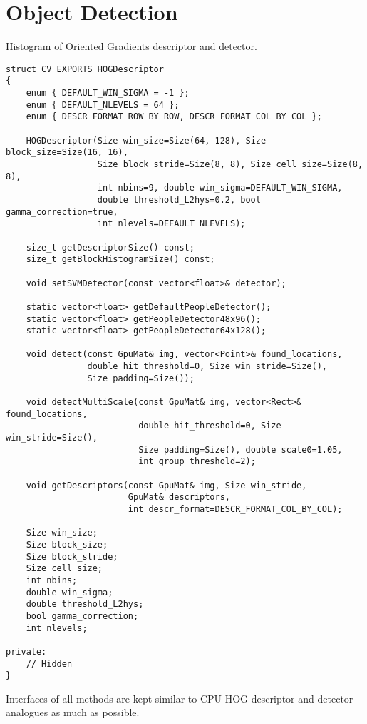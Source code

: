 \section{Object Detection}

Histogram of Oriented Gradients descriptor and detector.

\begin{lstlisting}
struct CV_EXPORTS HOGDescriptor
{
    enum { DEFAULT_WIN_SIGMA = -1 };
    enum { DEFAULT_NLEVELS = 64 };
    enum { DESCR_FORMAT_ROW_BY_ROW, DESCR_FORMAT_COL_BY_COL };

    HOGDescriptor(Size win_size=Size(64, 128), Size block_size=Size(16, 16),
                  Size block_stride=Size(8, 8), Size cell_size=Size(8, 8),
                  int nbins=9, double win_sigma=DEFAULT_WIN_SIGMA,
                  double threshold_L2hys=0.2, bool gamma_correction=true,
                  int nlevels=DEFAULT_NLEVELS);

    size_t getDescriptorSize() const;
    size_t getBlockHistogramSize() const;

    void setSVMDetector(const vector<float>& detector);

    static vector<float> getDefaultPeopleDetector();
    static vector<float> getPeopleDetector48x96();
    static vector<float> getPeopleDetector64x128();

    void detect(const GpuMat& img, vector<Point>& found_locations, 
                double hit_threshold=0, Size win_stride=Size(), 
                Size padding=Size());

    void detectMultiScale(const GpuMat& img, vector<Rect>& found_locations,
                          double hit_threshold=0, Size win_stride=Size(), 
                          Size padding=Size(), double scale0=1.05, 
                          int group_threshold=2);

    void getDescriptors(const GpuMat& img, Size win_stride, 
                        GpuMat& descriptors,
                        int descr_format=DESCR_FORMAT_COL_BY_COL);

    Size win_size;
    Size block_size;
    Size block_stride;
    Size cell_size;
    int nbins;
    double win_sigma;
    double threshold_L2hys;
    bool gamma_correction;
    int nlevels;

private:
    // Hidden
}
\end{lstlisting}

Interfaces of all methods are kept similar to CPU HOG descriptor and detector analogues as much as possible.


